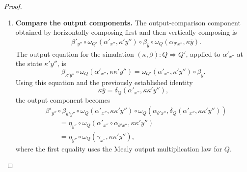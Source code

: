 \begin{proof}
\begin{enumerate}
        \item \textbf{Compare the output components.}
        The output-comparison component obtained by horizontally composing
        first and then vertically composing is
        \[
        \begin{aligned}
            &
            \beta'_{y''}
            \circ
            \omega_{Q'}(
                \alpha'_{x''},
                \kappa'y''
            )
            \circ
            \beta_{\overline y}
            \circ
            \omega_Q(
                \alpha_{\theta'x''},
                \kappa\overline y
            ).
        \end{aligned}
        \]
        The output equation for the simulation
        \((\kappa,\beta):Q\Rightarrow Q'\), applied to
        \(\alpha'_{x''}\) at the state \(\kappa'y''\), is
        \[
            \beta_{\kappa'y''}
            \circ
            \omega_Q(
                \alpha'_{x''},
                \kappa\kappa'y''
            )
            =
            \omega_{Q'}(
                \alpha'_{x''},
                \kappa'y''
            )
            \circ
            \beta_{\overline y}.
        \]
        Using this equation and the previously established identity
        \[
            \kappa\overline y
            =
            \delta_Q(
                \alpha'_{x''},
                \kappa\kappa'y''
            ),
        \]
        the output component becomes
        \[
        \begin{aligned}
            &
            \beta'_{y''}
            \circ
            \beta_{\kappa'y''}
            \circ
            \omega_Q(
                \alpha'_{x''},
                \kappa\kappa'y''
            )
            \circ
            \omega_Q\!\left(
                \alpha_{\theta'x''},
                \delta_Q(
                    \alpha'_{x''},
                    \kappa\kappa'y''
                )
            \right)
            \\
            &\qquad=
            \eta_{y''}
            \circ
            \omega_Q\!\left(
                \alpha'_{x''}\circ\alpha_{\theta'x''},
                \kappa\kappa'y''
            \right)
            \\
            &\qquad=
            \eta_{y''}
            \circ
            \omega_Q(
                \gamma_{x''},
                \kappa\kappa'y''
            ),
        \end{aligned}
        \]
        where the first equality uses the Mealy output multiplication law for
        \(Q\).


\end{enumerate}
\end{proof}
